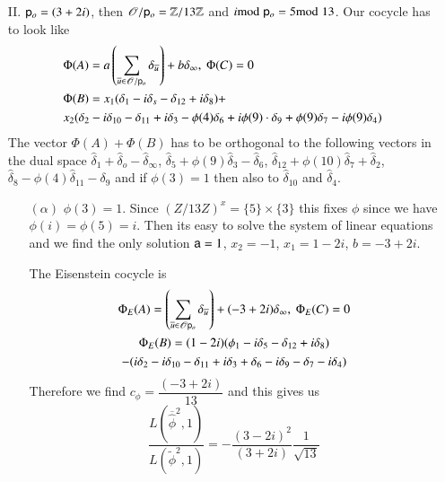 \begin{itemize}
\item[II.] $\mathsf{p}_{o}=(3+2i)$, then $\mathscr{O}/\mathsf{p}_{o}=\mathbb{Z}/13\mathbb{Z}$ and $i{\rm{mod}}\kern.3em \mathsf{p}_{o}=5{\rm{mod}}\kern.3em 13$. Our cocycle has to look like
\begin{align*}
&\Phi(A)=a\left(\sum\limits_{\overline{u}\in \mathscr{O}/\sfp_{o}}\delta_{\overline{u}}\right)+b\delta_{\infty}, \ \Phi(C)=0\\
&\Phi(B)=x_{1}(\delta_{1}-i\delta_{s}-\delta_{12}+i\delta_{8})+\\
&x_{2}(\delta_{2}-i\delta_{10}-\delta_{11}+i\delta_{3}-\phi(4)\delta_{6}+i\phi(9)\cdot \delta_{9}+\phi(9)\delta_{7}-i\phi(9)\delta_{4})
\end{align*}
The vector $\Phi(A)+\Phi(B)$ has to be orthogonal to the following vectors in the dual space
$\widehat{\delta}_{1}+\widehat{\delta}_{o}-\widehat{\delta}_{\infty}$, $\widehat{\delta}_{5}+\phi(9)\widehat{\delta}_{3}-\widehat{\delta}_{6}$, $\widehat{\delta}_{12}+\phi(10)\widehat{\delta}_{7}+\widehat{\delta}_{2}$, $\widehat{\delta}_{8}-\phi(4)\widehat{\delta}_{11}-\delta_{9}$ and if $\phi(3)=1$ then also to $\widehat{\delta}_{10}$ and $\widehat{\delta}_{4}$.
\begin{itemize}
\item[$(\alpha)$] $\phi(3)=1$. Since $(Z/13Z)^{x}=\{5\}\times\{3\}$ this fixes $\phi$ since we have $\phi(i)=\phi(5)=i$. Then its easy to solve the system of linear equations and we find the only solution $\mathsf{a}=1$, $x_{2}=-1$, $x_{1}=1-2i$, $b=-3+2i$.

The Eisenstein cocycle is
\begin{gather*}
\Phi_{E}(A)=\left(\sum\limits_{\overline{u}\in \mathscr{O}\mathsf{p}_{o}}\delta_{\overline{u}}\right)+(-3+2i)\delta_{\infty}, \ \Phi_{E}(C)=0\\
\Phi_{E}(B)=(1-2i)(\phi_{1}-i\delta_{5}-\delta_{12}+i\delta_{8})\\
-(i\delta_{2}-i\delta_{10}-\delta_{11}+i\delta_{3}+\delta_{6}-i\delta_{9}-\delta_{7}-i\delta_{4})
\end{gather*}
Therefore we find $c_{\phi}=\dfrac{(-3+2i)}{13}$ and this gives us
$$
\dfrac{L(\overline{\widehat{\phi}}^{2},1)}{L(\widetilde{\phi}^{2},1)}=-\dfrac{(3-2i)^{2}}{(3+2i)}\dfrac{1}{\sqrt{13}}
$$


\end{itemize}
\end{itemize}
